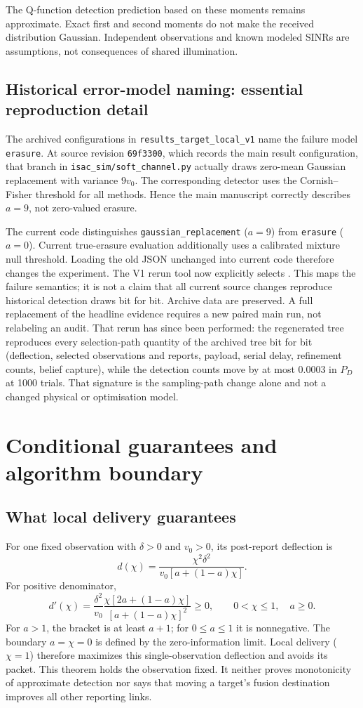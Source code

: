 \documentclass[10pt]{article}
\begin{document}
The Q-function detection prediction based on these moments remains
approximate. Exact first and second moments do not make the received
distribution Gaussian. Independent observations and known modeled SINRs
are assumptions, not consequences of shared illumination.

\subsection{Historical error-model naming: essential reproduction detail}
The archived configurations in \texttt{results\_target\_local\_v1} name the
failure model \texttt{erasure}. At source revision \texttt{69f3300}, which
records the main result configuration, that branch in
\texttt{isac\_sim/soft\_channel.py} actually draws zero-mean Gaussian
replacement with variance $9v_0$. The corresponding detector uses the
Cornish--Fisher threshold for all methods. Hence the main manuscript
correctly describes $a=9$, not zero-valued erasure.

The current code distinguishes \texttt{gaussian\_replacement} ($a=9$) from
\texttt{erasure} ($a=0$). Current true-erasure evaluation additionally uses
a calibrated mixture null threshold. Loading the old JSON unchanged into
current code therefore changes the experiment. The V1 rerun tool now
explicitly selects .
This maps the failure semantics; it is not a claim that all current source
changes reproduce historical detection draws bit for bit. Archive data are
preserved. A full replacement of the headline evidence requires a new paired
main run, not relabeling an audit. That rerun has since been performed: the
regenerated tree reproduces every selection-path quantity of the archived tree
bit for bit (deflection, selected observations and reports, payload, serial
delay, refinement counts, belief capture), while the detection counts move by
at most 0.0003 in $P_D$ at 1000 trials. That signature is the sampling-path
change alone and not a changed physical or optimisation model.

\section{Conditional guarantees and algorithm boundary}
\subsection{What local delivery guarantees}
For one fixed observation with $\delta>0$ and $v_0>0$, its post-report
deflection is
\[
 d(\chi)=\frac{\chi^2\delta^2}{v_0[a+(1-a)\chi]}.
\]
For positive denominator,
\[
 d'(\chi)=\frac{\delta^2}{v_0}
 \frac{\chi[2a+(1-a)\chi]}{[a+(1-a)\chi]^2}\ge0,
 \qquad 0<\chi\le1,\quad a\ge0.
\]
For $a>1$, the bracket is at least $a+1$; for $0\le a\le1$ it is nonnegative.
The boundary $a=\chi=0$ is defined by the zero-information limit.
Local delivery ($\chi=1$) therefore maximizes this single-observation
deflection and avoids its packet. This theorem holds the observation fixed.
It neither proves monotonicity of approximate detection nor says that
moving a target's fusion destination improves all other reporting links.
\end{document}
